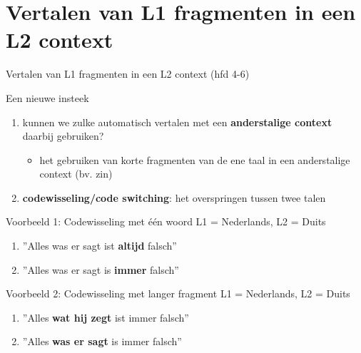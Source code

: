 \documentclass[8pt]{beamer}
\begin{document}
\section{Vertalen van L1 fragmenten in een L2 context}

\begin{frame}{Vertalen van L1 fragmenten in een L2 context (hfd 4-6)}
    \begin{block}{Een nieuwe insteek}
        \begin{enumerate}
            \item kunnen we zulke automatisch vertalen met een \textbf{anderstalige context} daarbij gebruiken?
            \begin{itemize}
            \item het gebruiken van korte fragmenten van de ene taal in een anderstalige context (bv. zin)
            \end{itemize}
            \item \textbf{codewisseling/code switching}: het overspringen tussen twee talen
        \end{enumerate}
    \end{block}

    \begin{block}{Voorbeeld 1: Codewisseling met één woord}
        L1 = Nederlands, L2 = Duits
        \begin{enumerate}
            \item ''Alles was er sagt ist \textbf{altijd} falsch''
            \item ''Alles was er sagt is \textbf{immer} falsch''
        \end{enumerate}
    \end{block}

    \begin{block}{Voorbeeld 2: Codewisseling met langer fragment}
        L1 = Nederlands, L2 = Duits
        \begin{enumerate}
            \item ''Alles \textbf{wat hij zegt} ist immer falsch''
            \item ''Alles \textbf{was er sagt} is immer falsch''
        \end{enumerate}
    \end{block}
\end{frame}
\end{document}
